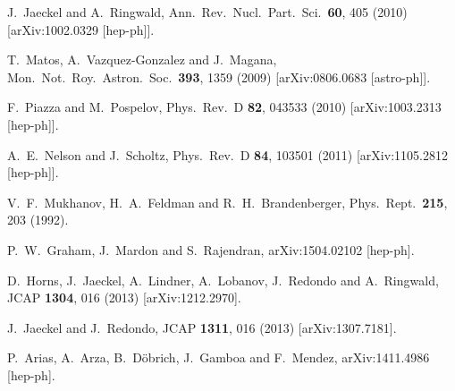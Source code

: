 \documentclass[prd,reprint,nofootinbib,notitlepage,aps,tightenlines,preprintnumbers,amsmath,amssymb,showpacs,superscriptaddress]{revtex4-1}
\begin{document}
\begin{thebibliography}{99}
  J.~Jaeckel and A.~Ringwald,
  Ann.\ Rev.\ Nucl.\ Part.\ Sci.\  {\bf 60}, 405 (2010)
  [arXiv:1002.0329 [hep-ph]].

  T.~Matos, A.~Vazquez-Gonzalez and J.~Magana,
  Mon.\ Not.\ Roy.\ Astron.\ Soc.\  {\bf 393}, 1359 (2009)
  [arXiv:0806.0683 [astro-ph]].

F.~Piazza and M.~Pospelov,
  Phys.\ Rev.\ D {\bf 82}, 043533 (2010)
  [arXiv:1003.2313 [hep-ph]].

A.~E.~Nelson and J.~Scholtz,
  Phys.\ Rev.\ D {\bf 84}, 103501 (2011)
  [arXiv:1105.2812 [hep-ph]].


  V.~F.~Mukhanov, H.~A.~Feldman and R.~H.~Brandenberger,
  Phys.\ Rept.\  {\bf 215}, 203 (1992).


  P.~W.~Graham, J.~Mardon and S.~Rajendran,
  arXiv:1504.02102 [hep-ph].

  D.~Horns, J.~Jaeckel, A.~Lindner, A.~Lobanov, J.~Redondo and A.~Ringwald,
  JCAP {\bf 1304}, 016 (2013)
  [arXiv:1212.2970].

  J.~Jaeckel and J.~Redondo,
  JCAP {\bf 1311}, 016 (2013)
  [arXiv:1307.7181].

  P.~Arias, A.~Arza, B.~Döbrich, J.~Gamboa and F.~Mendez,
  arXiv:1411.4986 [hep-ph].




\end{thebibliography}
\end{document}
